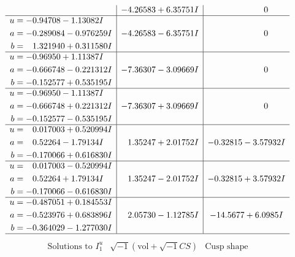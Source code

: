 \documentclass[1p]{elsarticle_modified}
\theoremstyle{definition}
\newcommand{\I}{\sqrt{-1}}
\begin{document}
$$\begin{array}{c|c|c}
 & -4.26583 + 6.35751 I & \phantom{-0.000000 } 0 \\ \hline\begin{aligned}
u &= -0.94708 - 1.13082 I \\
a &= -0.289084 - 0.976259 I \\
b &= \phantom{-}1.321940 + 0.311580 I\end{aligned}
 & -4.26583 - 6.35751 I & \phantom{-0.000000 } 0 \\ \hline\begin{aligned}
u &= -0.96950 + 1.11387 I \\
a &= -0.666748 - 0.221312 I \\
b &= -0.152577 + 0.535195 I\end{aligned}
 & -7.36307 - 3.09669 I & \phantom{-0.000000 } 0 \\ \hline\begin{aligned}
u &= -0.96950 - 1.11387 I \\
a &= -0.666748 + 0.221312 I \\
b &= -0.152577 - 0.535195 I\end{aligned}
 & -7.36307 + 3.09669 I & \phantom{-0.000000 } 0 \\ \hline\begin{aligned}
u &= \phantom{-}0.017003 + 0.520994 I \\
a &= \phantom{-}0.52264 - 1.79134 I \\
b &= -0.170066 + 0.616830 I\end{aligned}
 & \phantom{-}1.35247 + 2.01752 I & -0.32815 - 3.57932 I \\ \hline\begin{aligned}
u &= \phantom{-}0.017003 - 0.520994 I \\
a &= \phantom{-}0.52264 + 1.79134 I \\
b &= -0.170066 - 0.616830 I\end{aligned}
 & \phantom{-}1.35247 - 2.01752 I & -0.32815 + 3.57932 I \\ \hline\begin{aligned}
u &= -0.487051 + 0.184553 I \\
a &= -0.523976 + 0.683896 I \\
b &= -0.364029 - 1.277030 I\end{aligned}
 & \phantom{-}2.05730 - 1.12785 I & -14.5677 + 6.0985 I\\
 \hline 
 \end{array}$$\newpage$$\begin{array}{c|c|c}  
\text{Solutions to }I^u_{1}& \I (\text{vol} + \sqrt{-1}CS) & \text{Cusp shape}\\

\end{array}$$
\end{document}
